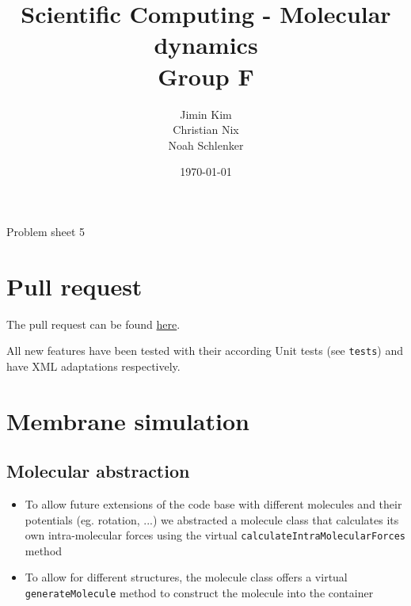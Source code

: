 \documentclass{article}
\title{Scientific Computing - Molecular dynamics \\ Group F}
\author{
    Jimin Kim \\
    Christian Nix \\
    Noah Schlenker
}
\date{\today}
\newcommand{\subtitle}{Problem sheet 5}
\begin{document}
\maketitle

\begin{center}
    \LARGE \subtitle{}
\end{center}

\section{Pull request}
\label{sec:pr}
The pull request can be found \href{https://github.com/noahpy/MolSim-SS24/pull/60}{here}.

All new features have been tested with their according Unit tests (see \texttt{tests}) and have XML adaptations respectively.

\section{Membrane simulation}
\label{sec:mem}

    \subsection{Molecular abstraction}
    \label{sec:mem:mol}
        \begin{itemize}
            \item To allow future extensions of the code base with different molecules and their potentials (eg. rotation, ...) we abstracted a molecule class that calculates its own intra-molecular forces using the virtual \texttt{calculateIntraMolecularForces} method
            \item To allow for different structures, the molecule class offers a virtual \texttt{generateMolecule} method to construct the molecule into the container
        \end{itemize}
\end{document}
